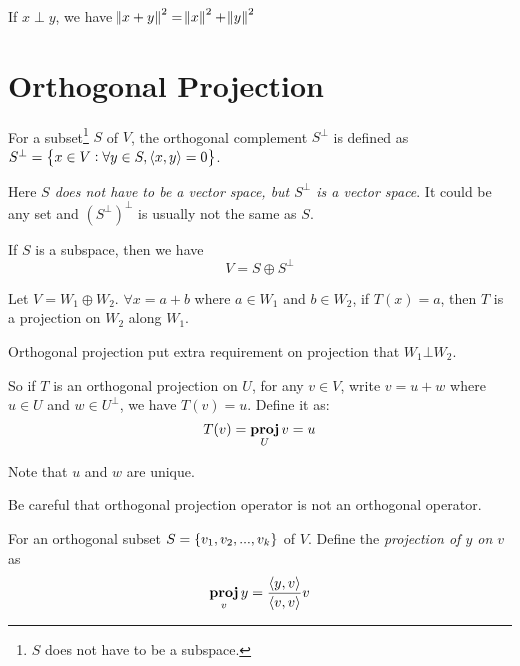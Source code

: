 \begin{theorem}
    If $x \perp y$, we have $\norm{x+y}^2 = \norm{x}^2 + \norm{y}^2$    
\end{theorem}




\section{Orthogonal Projection}



\begin{definition}
    For a subset\footnote{$S$ does not have to be a subspace.} $S$ of $V$, the orthogonal complement $S^\perp$ is defined as $S^\perp=\set{x \in V: \forall y \in S, \innerproduct{x}{y} = 0}$.
\end{definition}

Here \emph{$S$ does not have to be a vector space, but $S^\perp$ is a vector space}. It could be any set and $(S^\perp)^\perp$ is usually not the same as $S$. 

If $S$ is a subspace, then we have
\begin{equation}
    V = S \oplus S^\perp
\end{equation}

\begin{definition}
    Let $V = W_1 \oplus W_2$. $\forall x = a + b$ where $a \in W_1$ and $b \in W_2$, if $T(x) = a$, then $T$ is a projection on $W_2$ along $W_1$.
\end{definition}


\begin{definition}
    Orthogonal projection put extra requirement on projection that $W_1 \bot W_2$. 
    
    
    So if $T$ is an orthogonal projection on $U$, for any $v \in V$, write $v = u + w$ where $u \in U$ and $w \in U^\perp$, we have $T(v) = u$. Define it as:
    \begin{equation}
        T(v) = \projection{v}{U} = u
    \end{equation}
    
    Note that $u$ and $w$ are unique.
\end{definition}

Be careful that orthogonal projection operator is not an orthogonal operator.

\begin{definition}
    For an orthogonal subset $S=\set{v_1, v_2, ..., v_k}$ of $V$. Define the \emph{projection of $y$ on $v$} as
    \begin{equation}
        \projection{y}{v} = \frac{\innerproduct{y}{v}}{\innerproduct{v}{v}} v
    \end{equation}
\end{definition}

